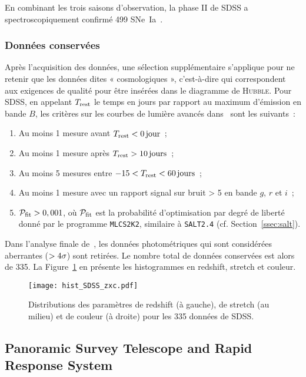 \documentclass[../main/main.tex]{subfiles}
\begin{document}
En combinant les trois saisons d'observation, la phase II de SDSS a
spectroscopiquement confirmé 499 SNe~Ia~\citep{sako2018}.

\subsubsection{Données conservées}\label{sssec:sdssdata}

Après l'acquisition des données, une sélection supplémentaire s'applique pour ne
retenir que les données dites « cosmologiques », c'est-à-dire qui correspondent
aux exigences de qualité pour être insérées dans le diagramme de
\textsc{Hubble}. Pour SDSS, en appelant $T_{\rm rest}$ le temps en jours par
rapport au maximum d'émission en bande $B$, les critères sur les courbes de
lumière avancés dans~\cite{kessler2009b} sont les suivants~:

\begin{enumerate}
    \item Au moins 1 mesure avant $T_{\rm rest} < \SI{0}{jour}$~;
    \item Au moins 1 mesure après $T_{\rm rest} > \SI{10}{jours}$~;
    \item Au moins 5 mesures entre $-15 < T_{\rm rest} < \SI{60}{jours}$~;
    \item Au moins 1 mesure avec un rapport signal sur bruit > 5 en bande $g$,
        $r$ et $i$~;
    \item $\mathcal{P}_{\rm fit} > 0,001$, où $\mathcal{P}_{\rm fit}$ est la
        probabilité d'optimisation par degré de liberté donné par le programme
        \texttt{MLCS2K2}, similaire à \texttt{SALT2.4} (cf.
        Section~\ref{ssec:salt}).
\end{enumerate}
Dans l'analyse finale de~\cite{scolnic2018}, les données photométriques qui sont
considérées aberrantes ($>4\sigma$) sont retirées. Le nombre total de données
conservées est alors de 335. La Figure~\ref{fig:sdsshist} en présente les
histogrammes en redshift, stretch et couleur.

\begin{figure}[ht]
    \centering
    \texttt{[image: hist\_SDSS\_zxc.pdf]}
    \captionsetup{justification=centering}
    \caption{Distributions des paramètres de redshift (à gauche), de stretch (au
    milieu) et de couleur (à droite) pour les 335 données de SDSS.}
    \label{fig:sdsshist}
\end{figure}

\subsection{Panoramic Survey Telescope and Rapid Response
System}\label{ssec:ps1}
\end{document}
